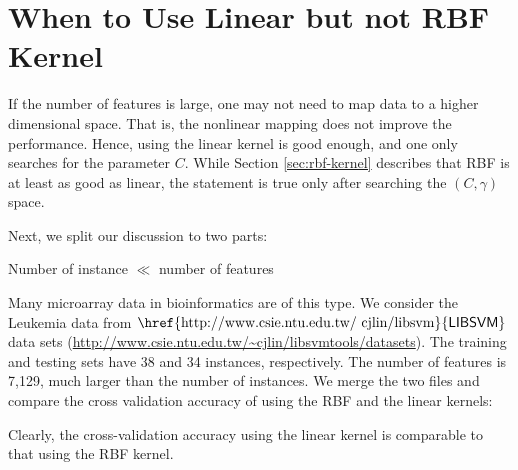 \documentclass[12pt]{article}
\newcommand{\libsvm}{$\mbox{\href{http://www.csie.ntu.edu.tw/~cjlin/libsvm}{\sf LIBSVM}}$\xspace}
\begin{document}
\section{When to Use Linear but not
RBF Kernel}
\label{sec:when-use-linear}

If the number of features is large, one may
not need to map data to a higher dimensional
space. That is, 
the nonlinear mapping does not improve
the performance.
Hence, using the linear kernel is good
enough, and one only searches for the parameter
$C$. While Section \ref{sec:rbf-kernel}
describes that RBF is at least as good as linear,
the statement is true only
after searching the $(C, \gamma)$ space.

Next, we split our discussion to two parts:

 Number of instance $\ll$ number of features

  Many microarray data in bioinformatics are of this type. We consider
  the Leukemia data from \libsvm data sets
  (\url{http://www.csie.ntu.edu.tw/~cjlin/libsvmtools/datasets}). The
  training and testing sets have 38 and 34
instances, respectively. The number
  of features is 7,129, much larger
than the number of instances. 
We merge the two files and
  compare the cross validation accuracy of using the RBF and the
  linear kernels:

  Clearly, the cross-validation accuracy using the linear kernel is comparable to that using the
  RBF kernel.
\end{document}
